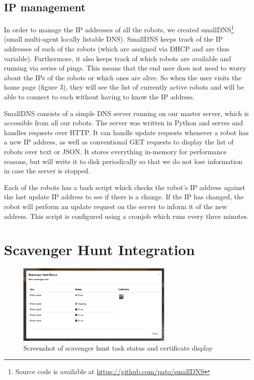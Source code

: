 \documentclass[
  oneside,
  11pt, a4paper,
  footinclude=true,
  headinclude=true,
  cleardoublepage=empty
]{article}
\begin{document}
\subsection{IP management}

In order to manage the IP addresses of all the robots, we created
smallDNS\footnote{Source code is available at
\url{https://github.com/pato/smallDNS}} (small multi-agent locally listable
DNS). SmallDNS keeps track of the IP addresses of each of the robots (which are
assigned via DHCP and are thus variable). Furthermore, it also keeps track of
which robots are available and running via series of pings. This means that the
end user does not need to worry about the IPs of the robots or which ones are
alive. So when the user visits the home page (figure 3), they will see the list
of currently active robots and will be able to connect to each without having
to know the IP address.

SmallDNS consists of a simple DNS server running on our master server, which is
accessible from all our robots. The server was written in Python and serves and
handles requests over HTTP. It can handle update requests whenever a robot has
a new IP address, as well as conventional GET requests to display the list of
robots over text or JSON. It stores everything in-memory for performance
reasons, but will write it to disk periodically so that we do not lose
information in case the server is stopped.

Each of the robots has a bash script which checks the robot's IP address against the
last update IP address to see if there is a change. If the IP has changed, the robot
will perform an update request on the server to inform it of the new address. This
script is configured using a cronjob which runs every three minutes.

\section{Scavenger Hunt Integration}

\begin{figure}
\centering
\includegraphics[width=3in]{scav_certs}
\caption{Screenshot of scavenger hunt task status and certificate display}
\label{scavfig}
\end{figure}
\end{document}
